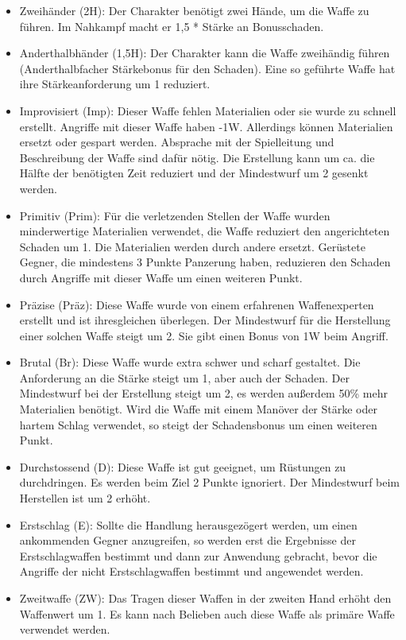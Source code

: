 \documentclass{article}
\begin{document}
\begin{itemize}
\item Zweihänder (2H): Der Charakter benötigt zwei Hände, um die Waffe zu führen. Im Nahkampf macht er 1,5 * Stärke an Bonusschaden.
\item Anderthalbhänder (1,5H): Der Charakter kann die Waffe zweihändig führen (Anderthalbfacher Stärkebonus für den Schaden). Eine so geführte Waffe hat ihre Stärkeanforderung um 1 reduziert.
\item Improvisiert (Imp): Dieser Waffe fehlen Materialien oder sie wurde zu schnell erstellt. Angriffe mit dieser Waffe haben -1W. Allerdings können Materialien ersetzt oder gespart werden. Absprache mit der Spielleitung und Beschreibung der Waffe sind dafür nötig. Die Erstellung kann um ca. die Hälfte der benötigten Zeit reduziert und der Mindestwurf um 2 gesenkt werden.
\item Primitiv (Prim): Für die verletzenden Stellen der Waffe wurden minderwertige Materialien verwendet, die Waffe reduziert den angerichteten Schaden um 1. Die Materialien werden durch andere ersetzt. Gerüstete Gegner, die mindestens 3 Punkte Panzerung haben, reduzieren den Schaden durch Angriffe mit dieser Waffe um einen weiteren Punkt.
\item Präzise (Präz): Diese Waffe wurde von einem erfahrenen Waffenexperten erstellt und ist ihresgleichen überlegen. Der Mindestwurf für die Herstellung einer solchen Waffe steigt um 2. Sie gibt einen Bonus von 1W beim Angriff.
\item Brutal (Br): Diese Waffe wurde extra schwer und scharf gestaltet. Die Anforderung an die Stärke steigt um 1, aber auch der Schaden. Der Mindestwurf bei der Erstellung steigt um 2, es werden außerdem 50\% mehr Materialien benötigt. Wird die Waffe mit einem Manöver der Stärke oder hartem Schlag verwendet, so steigt der Schadensbonus um einen weiteren Punkt.
\item Durchstossend (D): Diese Waffe ist gut geeignet, um Rüstungen zu durchdringen. Es werden beim Ziel 2 Punkte ignoriert. Der Mindestwurf beim Herstellen ist um 2 erhöht.
\item Erstschlag (E): Sollte die Handlung herausgezögert werden, um einen ankommenden Gegner anzugreifen, so werden erst die Ergebnisse der Erstschlagwaffen bestimmt und dann zur Anwendung gebracht, bevor die Angriffe der nicht Erstschlagwaffen bestimmt und angewendet werden.
\item Zweitwaffe (ZW): Das Tragen dieser Waffen in der zweiten Hand erhöht den Waffenwert um 1. Es kann nach Belieben auch diese Waffe als primäre Waffe verwendet werden.

\end{itemize}
\end{document}
